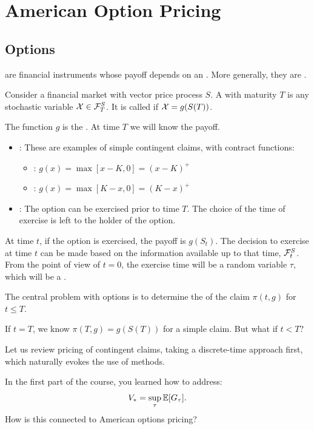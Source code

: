 \section{American Option Pricing}

\subsection{Options}

\begin{remark}
     are financial instruments whose payoff depends on an . More generally, they are .
\end{remark}

\begin{definition}
    Consider a financial market with vector price process $S$. A  with maturity $T$ is any stochastic variable $\mathcal{X} \in \mathcal{F}_T^S$. It is called  if $\mathcal{X} = g(S(T))$.
    
    The function $g$ is the . At time $T$ we will know the payoff.
\end{definition}

\begin{itemize}
    \item {}: These are examples of simple contingent claims, with contract functions:
    \begin{itemize}
        \item {}: $g(x) = \max[x-K, 0] = (x-K)^+$
        \item {}: $g(x) = \max[K-x, 0] = (K-x)^+$
    \end{itemize}
    
    \item {}: The option can be exercised prior to time $T$. The choice of the time of exercise is left to the holder of the option.
\end{itemize}

\begin{remark}
    At time $t$, if the option is exercised, the payoff is $g(S_t)$. The decision to exercise at time $t$ can be made based on the information available up to that time, $\mathcal{F}_t^S$. From the point of view of $t=0$, the exercise time will be a random variable $\tau$, which will be a .
    
    The central problem with options is to determine the  of the claim $\pi(t, g)$ for $t \leq T$.
    
    If $t=T$, we know $\pi(T, g) = g(S(T))$ for a simple claim. But what if $t < T$?
    
    Let us review pricing of contingent claims, taking a discrete-time approach first, which naturally evokes the use of  methods.
    
    In the first part of the course, you learned how to address:
    \[ V_* = \sup_\tau \mathbb E[G_\tau]. \]
    How is this connected to American options pricing?
\end{remark}

